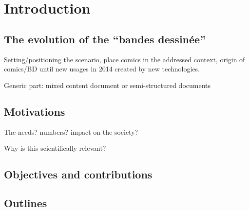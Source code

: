 \chapter{Introduction}%
\label{chap:intro}
\graphicspath{{./chapters/1-introduction/figs/}}
\section{The evolution of the ``bandes dessinée''}
Setting/positioning the scenario, place comics in the addressed context, origin of comics/BD until new usages in 2014 created by new technologies.
\cite[p.~215]{McCloud94}


Generic part: mixed content document or semi-structured documents

\section{Motivations}
The needs? numbers? impact on the society?

Why is this scientifically relevant?

\section{Objectives and contributions}


\section{Outlines}

